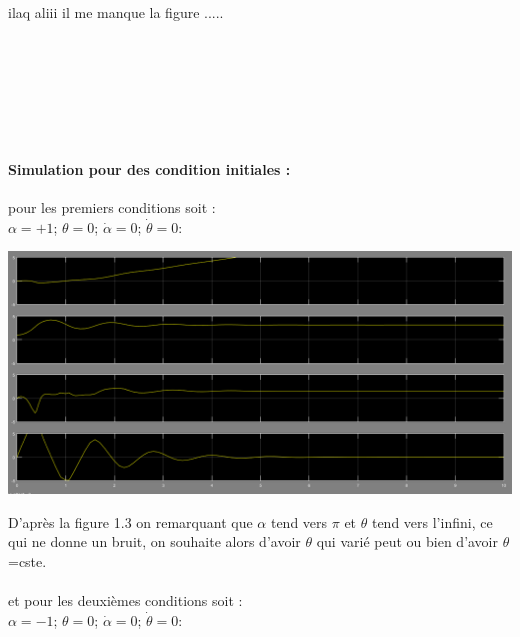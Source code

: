 \documentclass[12pt, a4paper, openany]{report}
\begin{document}
 ilaq aliii il me manque la figure ..... \\\\\\\\\\\\\\
 
 \paragraph{Simulation pour des condition initiales :\\} 
 
 pour les premiers conditions soit :\\
$\alpha=+1$; $\theta=0$; $\dot{\alpha}=0$; $\dot{\theta} = 0:$ \\
                                                   
\begin{center}
\includegraphics[scale=0.4]{alpha=+1.PNG}
\label{fig1} 
\end{center}
 
D’après la figure 1.3 on remarquant que $\alpha$ tend vers $\pi$ et $\theta$
tend vers l'infini, ce qui ne donne un bruit, on souhaite alors d'avoir $\theta$ qui varié peut ou bien d'avoir $\theta$=cste.\\\\  
 
et pour les deuxièmes conditions soit :\\
$\alpha=-1$; $\theta=0$; $\dot{\alpha}=0$; $\dot{\theta} = 0:$ \\
                                                   
\end{document}
